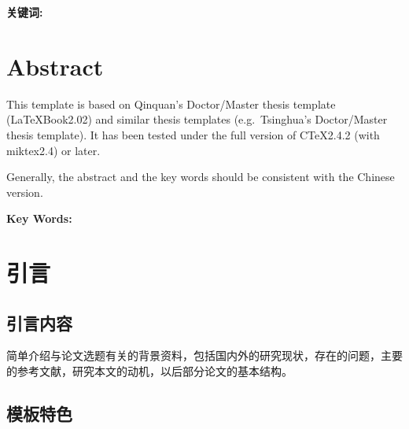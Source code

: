 \documentclass[12pt,a4paper,zihao=-4,UTF8]{book}
\renewcommand{\baselinestretch}{1.5} %
\begin{document}
\vspace{1em} \noindent  \textbf{关键词:} \rmfamily \KeywordsCHS

\renewcommand{\baselinestretch}{1.8}

\chapter*{Abstract}

This template is based on Qinquan's Doctor/Master thesis template
(LaTeXBook2.02) and similar thesis templates (e.g.~Tsinghua's
Doctor/Master thesis template). It has been tested under the full
version of CTeX2.4.2 (with miktex2.4) or later.

Generally, the abstract and the key words should be consistent with the
Chinese version.

\vspace{1em} \noindent  \textbf{Key Words:} \KeywordsENG

\mainmatter 

\renewcommand{\baselinestretch}{1.5}

\fontsize{11pt}{12pt}\selectfont

 \setcounter{page}{1}

\chapter{引言}

\section{引言内容}

简单介绍与论文选题有关的背景资料，包括国内外的研究现状，存在的问题，主要的参考文献，研究本文的动机，以后部分论文的基本结构。

\section{模板特色}
\end{document}
